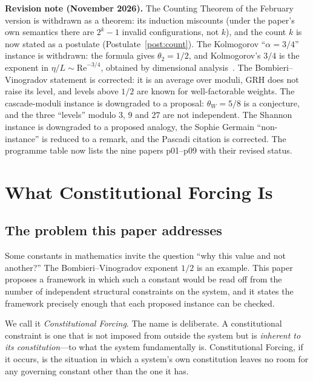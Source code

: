 \documentclass[12pt]{amsart}
\theoremstyle{plain}
\theoremstyle{definition}
\theoremstyle{remark}
\begin{document}
\noindent\textbf{Revision note (November 2026).}
The Counting Theorem of the February version is withdrawn as a theorem: its
induction miscounts (under the paper's own semantics there are $2^k - 1$
invalid configurations, not $k$), and the count $k$ is now stated as a
postulate (Postulate~\ref{post:count}). The Kolmogorov ``$\alpha = 3/4$''
instance is withdrawn: the formula gives $\theta_2 = 1/2$, and Kolmogorov's
$3/4$ is the exponent in $\eta/L \sim \mathrm{Re}^{-3/4}$, obtained by
dimensional analysis~\cite{Kolmogorov1941}. The Bombieri--Vinogradov statement
is corrected: it is an average over moduli, GRH does not raise its level, and
levels above $1/2$ are known for well-factorable weights. The cascade-moduli
instance is downgraded to a proposal: $\theta_W = 5/8$ is a conjecture, and the
three ``levels'' modulo $3$, $9$ and $27$ are not independent. The Shannon
instance is downgraded to a proposed analogy, the Sophie Germain
``non-instance'' is reduced to a remark, and the Pascadi citation is corrected.
The programme table now lists the nine papers p01--p09 with their revised
status.

\tableofcontents

\section{What Constitutional Forcing Is}

\subsection{The problem this paper addresses}

Some constants in mathematics invite the question ``why this value and not
another?'' The Bombieri--Vinogradov exponent $1/2$ is an example. This paper
proposes a framework in which such a constant would be read off from the number
of independent structural constraints on the system, and it states the
framework precisely enough that each proposed instance can be checked.

We call it \emph{Constitutional Forcing}. The name is deliberate. A
constitutional constraint is one that is not imposed from outside the system but
is \emph{inherent to its constitution}---to what the system fundamentally is.
Constitutional Forcing, if it occurs, is the situation in which a system's own
constitution leaves no room for any governing constant other than the one it
has.
\end{document}

